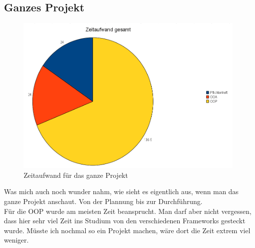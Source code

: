\subsection{Ganzes Projekt}
\begin{figure}[ht]
\begin{center}
\includegraphics[width=15cm]{images/projekt_gsam.png}
\caption{Zeitaufwand für das ganze Projekt}
\end{center}
\end{figure}
Was mich auch noch wunder nahm, wie sieht es eigentlich aus, wenn man das ganze Projekt anschaut. Von der Plannung bis zur Durchführung. \\
Für die OOP wurde am meisten Zeit beansprucht. Man darf aber nicht vergessen, dass hier sehr viel Zeit ins Studium von den verschiedenen Frameworks gesteckt wurde. Müsste ich nochmal so ein Projekt machen, wäre dort die Zeit extrem viel weniger.
\clearpage
